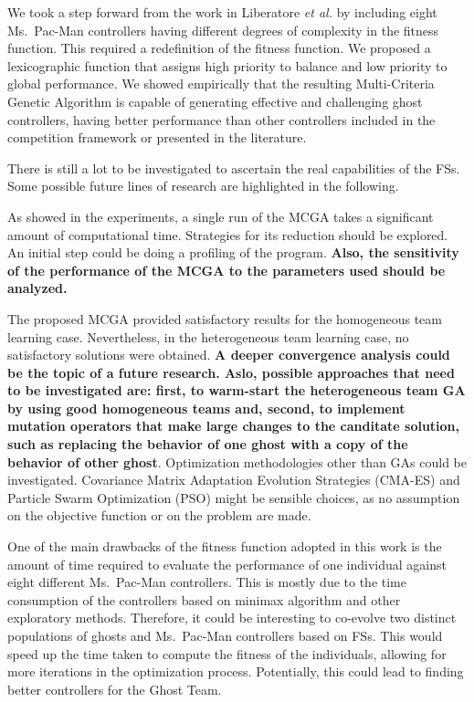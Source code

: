 \documentclass[journal]{IEEEtran}
\begin{document}
We took a step forward from the work in Liberatore \emph{et al.} \cite{Liberatore2014} by including eight Ms.\  Pac-Man controllers having different degrees of complexity in the fitness function. This required a redefinition of the fitness function. We proposed a lexicographic function that assigns high priority to balance and low priority to global performance. We showed empirically that the resulting Multi-Criteria Genetic Algorithm is capable of generating effective and challenging ghost controllers, having better performance than other controllers included in the competition framework or presented in the literature.

There is still a lot to be investigated to ascertain the real capabilities of the FSs. Some possible future lines of research are highlighted in the following.

As showed in the experiments, a single run of the MCGA takes a significant amount of computational time. Strategies for its reduction should be explored. An initial step could be doing a profiling of the program. \textbf{Also, the sensitivity of the performance of the MCGA to the parameters used should be analyzed.}

The proposed MCGA provided satisfactory results for the homogeneous team learning case. Nevertheless, in the heterogeneous team learning case, no satisfactory solutions were obtained. \textbf{A deeper convergence analysis could be the topic of a future research. Aslo, possible approaches that need to be investigated are: first, to warm-start the heterogeneous team GA by using good homogeneous teams and, second, to implement mutation operators that make large changes to the canditate solution, such as replacing the behavior of one ghost with a copy of the behavior of other ghost}.  Optimization methodologies other than GAs could be investigated. Covariance Matrix Adaptation Evolution Strategies (CMA-ES) and Particle Swarm Optimization (PSO) might be sensible choices, as no assumption on the objective function or on the problem are made.

One of the main drawbacks of the fitness function adopted in this work is the amount of time required to evaluate the performance of one individual against eight different Ms.\  Pac-Man controllers. This is mostly due to the time consumption of the controllers based on minimax algorithm and other exploratory methods. Therefore, it could be interesting to co-evolve two distinct populations of ghosts and Ms.\  Pac-Man controllers based on FSs. This would speed up the time taken to compute the fitness of the individuals, allowing for more iterations in the optimization process. Potentially, this could lead to finding better controllers for the Ghost Team.
\end{document}
